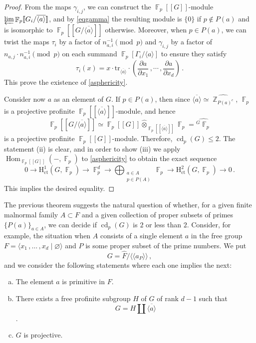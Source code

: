 \documentclass[a4paper]{amsart}
\theoremstyle{definition}
\theoremstyle{remark}
\DeclareMathOperator{\bbz}{\mathbb{Z}}
\DeclareMathOperator{\bbf}{\mathbb{F}}
\DeclareMathOperator{\Hom}{\mathrm{Hom}}
\DeclareMathOperator{\cd}{\mathrm{cd}}
\newcommand{\Falgebra}[1]{\bbf_p[#1]}
\newcommand{\FFalgebra}[1]{\bbf_p[\![#1]\!]}
\newcommand{\HH}{\mathrm{H}}
\begin{document}
\begin{proof}
From the maps $\gamma_{i,j}$, we can construct the $\FFalgebra{G}$-module \(\varprojlim \FFalgebra{G_i/\overline{\langle a \rangle}}\), and by \cref{eqgamma} the resulting module is \(\{0\}\) if \(p \not\in P(a)\) and is isomorphic to \(\FFalgebra{G/\overline{\langle a \rangle}}\) otherwise. Moreover, when \(p \in P(a)\), we can twist the maps \(\tau_i\) by a factor of \(n_{a,i}^{-1} \pmod p\) and \(\gamma_{i,j}\) by a factor of \(n_{a,j}\cdot n_{a,i}^{-1} \pmod{p}\) on each summand \(\Falgebra{\Gamma_i/\langle a\rangle}\) to ensure they satisfy \[\tau_i(x) = x\cdot \mathrm{tr}_{\overline{\langle a \rangle}} \cdot \left(\frac{\partial a}{\partial x_1}\,,\cdots\,,\frac{\partial a}{\partial x_d}\right)\,.\] This prove the existence of \cref{asphericity}.

Consider now \(a\) as an element of \(G\). If \(p \in P(a)\), then since \(\overline{\langle a \rangle} \simeq \widehat{\bbz_{P(a)^c}}\), \(\bbf_p\) is a projective profinite \(\FFalgebra{\overline{\langle a \rangle}}\)-module, and hence \[\FFalgebra{G/\overline{\langle  a\rangle}} \simeq \FFalgebra{G} \widehat{\otimes}_{\FFalgebra{\overline{\langle a \rangle}}} \bbf_p = \widehat{^G \bbf_p}\] is a projective profinite \(\FFalgebra{G}\)-module. Therefore, \(\cd_p(G) \leq 2\). The statement (ii) is clear, and in order to show (iii) we apply \(\Hom_{\FFalgebra{G}}(-,\bbf_p)\) to \cref{asphericity} to obtain the exact sequence \[0 \to \HH^1_{\mathrm{ct}}(G,\bbf_p) \to \bbf_p^d \to \bigoplus_{\substack{a \in A\\ p \in P(A)}} \bbf_p \to \HH^2_{\mathrm{ct}}(G,\bbf_p) \to 0\,.\] This implies the desired equality.
\end{proof}

The previous theorem suggests the natural question of whether, for a given finite malnormal family \(A\subset F\) and a given collection of proper subsets of primes \(\{P(a)\}_{a \in A}\), we can decide if \(\cd_p(G)\) is \(2\) or less than \(2\). Consider, for example, the situation when \(A\) consists of a single element \(a\) in the free group \(F = \langle x_1\,,\ldots\,, x_d \mid \varnothing\rangle\) and \(P\) is some proper subset of the prime numbers. We put \[G = \widehat{F}/\langle\!\langle a_P\rangle\!\rangle\,,\] and we consider the following statements where each one implies the next:
\begin{enumerate}[(a)]
    \item The element \(a\) is primitive in \(F\).
    \item There exists a free profinite subgroup \(H\) of \(G\) of rank \(d-1\) such that \[G = H \amalg \overline{\langle a \rangle}\].
    \item \(G\) is projective.
\end{enumerate}
\end{document}

